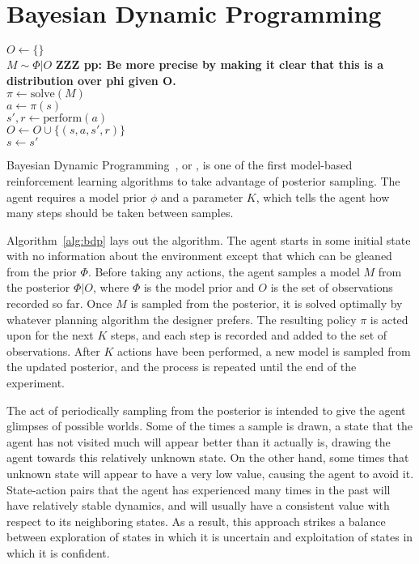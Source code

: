 \section{Bayesian Dynamic Programming}

\begin{algorithm}[tb]
	\caption{$\mbox{Bayesian~DP}(s, \Phi, K)$}
	\label{alg:bdp}
	$O \leftarrow \{\}$\\
	 {
		$M \sim \Phi|O$ \bf{ZZZ} pp: Be more precise by making it clear that this is a distribution over phi given O.\\
		$\pi \leftarrow \mbox{solve}(M)$\\
		 {
			$a \leftarrow \pi(s)$\\
			$s', r \leftarrow \mbox{perform}(a)$\\
			$O \leftarrow O \cup \{(s, a, s', r)\} $\\
			$s \leftarrow s'$
		}
	}
\end{algorithm}

Bayesian Dynamic Programming~\cite{strens00}, or , is one of the first model-based reinforcement learning algorithms to take advantage of posterior sampling. The agent requires a model prior $\phi$ and a parameter $K$, which tells the agent how many steps should be taken between samples.

Algorithm~\ref{alg:bdp} lays out the  algorithm. The agent starts in some initial state with no information about the environment except that which can be gleaned from the prior $\Phi$. Before taking any actions, the agent samples a model $M$ from the posterior $\Phi|O$, where $\Phi$ is the model prior and $O$ is the set of observations recorded so far. Once $M$ is sampled from the posterior, it is solved optimally by whatever planning algorithm the designer prefers. The resulting policy $\pi$ is acted upon for the next $K$ steps, and each step is recorded and added to the set of observations. After $K$ actions have been performed, a new model is sampled from the updated posterior, and the process is repeated until the end of the experiment.

The act of periodically sampling from the posterior is intended to give the agent glimpses of possible worlds. Some of the times a sample is drawn, a state that the agent has not visited much will appear better than it actually is, drawing the agent towards this relatively unknown state. On the other hand, some times that unknown state will appear to have a very low value, causing the agent to avoid it. State-action pairs that the agent has experienced many times in the past will have relatively stable dynamics, and will usually have a consistent value with respect to its neighboring states. As a result, this approach strikes a balance between exploration of states in which it is uncertain and exploitation of states in which it is confident.

